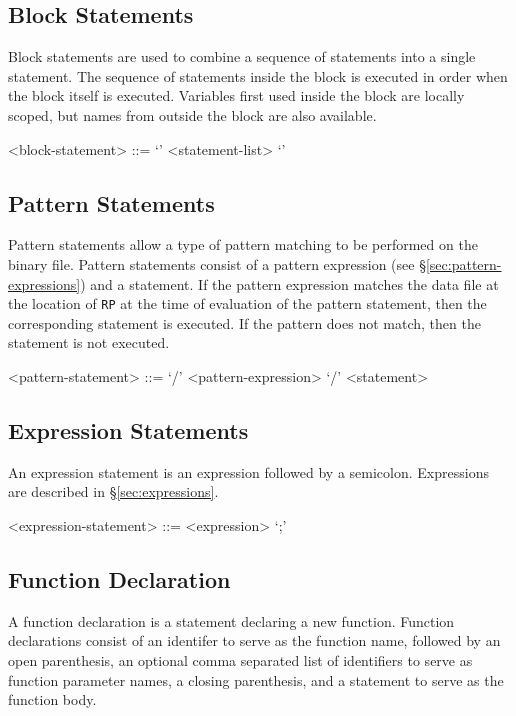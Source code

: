 \documentclass[letterpaper]{article}
\begin{document}
\subsection{Block Statements}
Block statements are used to combine a sequence of statements into a single statement.  The sequence of statements inside the block is executed in order when the block itself is executed.  Variables first used inside the block are locally scoped, but names from outside the block are also available.
\begin{grammar}
<block-statement> ::= `{' <statement-list> `}'
\end{grammar}

\subsection{Pattern Statements}
\label{sec:pattern-statement}
Pattern statements allow a type of pattern matching to be performed on the binary file.  Pattern statements consist of a pattern expression (see \S\ref{sec:pattern-expressions}) and a statement.  If the pattern expression matches the data file at the location of \texttt{RP} at the time of evaluation of the pattern statement, then the corresponding statement is executed.  If the pattern does not match, then the statement is not executed.
\begin{grammar}
<pattern-statement> ::= `/' <pattern-expression> `/' <statement>
\end{grammar}

\subsection{Expression Statements}
An expression statement is an expression followed by a semicolon.  Expressions are described in \S\ref{sec:expressions}.

\begin{grammar}
<expression-statement> ::= <expression> `;'
\end{grammar}

\subsection{Function Declaration}
A function declaration is a statement declaring a new function.  Function declarations consist of an identifer to serve as the function name, followed by an open parenthesis, an optional comma separated list of identifiers to serve as function parameter names, a closing parenthesis, and a statement to serve as the function body.
\end{document}
